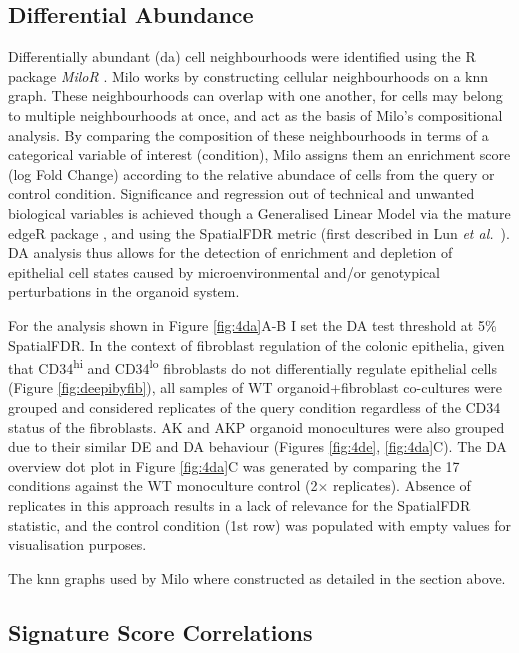 \subsection{Differential Abundance}

Differentially abundant (\acrshort{da}) cell neighbourhoods were identified using the R package \textit{MiloR} \cite{dann_differential_2022}. Milo works by constructing cellular neighbourhoods on a \acrshort{knn} graph. These neighbourhoods can overlap with one another, for cells may belong to multiple neighbourhoods at once, and act as the basis of Milo's compositional analysis. By comparing the composition of these neighbourhoods in terms of a categorical variable of interest (condition), Milo assigns them an enrichment score (log Fold Change) according to the relative abundace of cells from the query or control condition. Significance and regression out of technical and unwanted biological variables is achieved though a Generalised Linear Model via the mature edgeR package \cite{robinson_edger_2010}, and using the SpatialFDR metric (first described in Lun \emph{et al.}~\cite{lun_testing_2017}).
DA analysis thus allows for the detection of enrichment and depletion of epithelial cell states caused by microenvironmental and/or genotypical perturbations in the organoid system. 

For the analysis shown in Figure \ref{fig:4da}A-B I set the DA test threshold at 5\% SpatialFDR. In the context of fibroblast regulation of the colonic epithelia, given that CD34\textsuperscript{hi} and CD34\textsuperscript{lo} fibroblasts do not differentially regulate epithelial cells (Figure \ref{fig:deepibyfib}), all samples of WT organoid+fibroblast co-cultures were grouped and considered replicates of the query condition regardless of the CD34 status of the fibroblasts. AK and AKP organoid monocultures were also grouped due to their similar DE and DA behaviour (Figures \ref{fig:4de}, \ref{fig:4da}C).
The DA overview dot plot in Figure \ref{fig:4da}C was generated by comparing the 17 conditions against the WT monoculture control (2$\times$ replicates). Absence of replicates in this approach results in a lack of relevance for the SpatialFDR statistic, and the control condition (1st row) was populated with empty values for visualisation purposes. 

The \acrshort{knn} graphs used by Milo where constructed as detailed in the section above.

\subsection{Signature Score Correlations}


